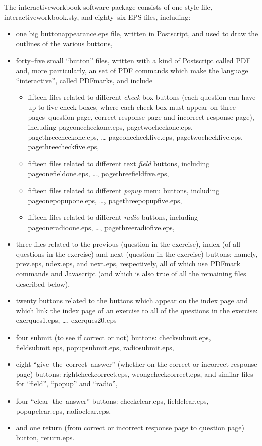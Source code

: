 \documentclass[12pt]{article}
\begin{document}
The interactiveworkbook software package consists of one style
file, interactiveworkbook.sty, and eighty--six EPS files,
including:
\begin{itemize}
    \item one big buttonappearance.eps file, written in Postscript, and
    used to draw the outlines of the various buttons,
    \item forty--five small ``button'' files, written with a kind of
    Postscript called PDF and, more particularly, an set
    of PDF commands which make the language ``interactive'', called PDFmarks, and include
    \begin{itemize}
        \item fifteen files related to different {\it check} box buttons
        (each question can have up to five check boxes, where each check
        box must appear on three pages--question page, correct response page and
        incorrect response page), including
        pageonecheckone.eps, pagetwocheckone.eps, pagethreecheckone.eps, \ldots
        pageonecheckfive.eps, pagetwocheckfive.eps, pagethreecheckfive.eps,
        \item fifteen files related to different text {\it field} buttons, including
        pageonefieldone.eps, \ldots, pagethreefieldfive.eps,
        \item fifteen files related to different {\it popup} menu buttons, including
        pageonepopupone.eps, \ldots, pagethreepopupfive.eps,
        \item fifteen files related to different {\it radio} buttons, including
        pageoneradioone.eps, \ldots, pagethreeradiofive.eps,
    \end{itemize}
    \item three files related to the previous (question in the exercise),
    index (of all questions in the exercise) and next (question in the exercise) buttons;
    namely, prev.eps, ndex.eps, and next.eps, respectively, all of which use PDFmark
    commands and Javascript (and which is also true of all the remaining files described
    below),
    \item twenty buttons related to the buttons which appear on the index
    page and which link the index page of an
    exercise to all of the questions in the exercise: exerques1.eps, \ldots, exerques20.eps
    \item four submit (to see if correct or not) buttons:
    checksubmit.eps, fieldsubmit.eps, popupsubmit.eps, radiosubmit.eps,
    \item eight ``give--the--correct--answer'' (whether on the correct or incorrect
    response page) buttons:
    rightcheckcorrect.eps, wrongcheckcorrect.eps, and similar
    files for ``field'', ``popup''  and ``radio'',
    \item four ``clear--the--answer'' buttons:
    checkclear.eps, fieldclear.eps, popupclear.eps, radioclear.eps,
    \item and one return (from correct or incorrect response page to question
    page) button, return.eps.
\end{itemize}
\end{document}
